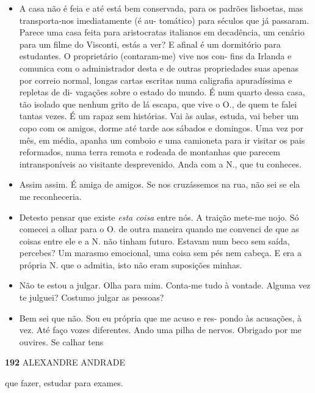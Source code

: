 \begin{itemize}
\tightlist
\item
  A casa não é feia e até está bem conservada, para os padrões
  lisboetas, mas transporta-nos imediatamente (é au- tomático) para
  séculos que já passaram. Parece uma casa feita para aristocratas
  italianos em decadência, um cenário para um filme do Visconti, estás a
  ver? E afinal é um dormitório para estudantes. O proprietário
  (contaram-me) vive nos con- fins da Irlanda e comunica com o
  administrador desta e de outras propriedades suas apenas por correio
  normal, longas cartas escritas numa caligrafia apuradíssima e repletas
  de di- vagações sobre o estado do mundo. É num quarto dessa casa, tão
  isolado que nenhum grito de lá escapa, que vive o O., de quem te falei
  tantas vezes. É um rapaz sem histórias. Vai às aulas, estuda, vai
  beber um copo com os amigos, dorme até tarde aos sábados e domingos.
  Uma vez por mês, em média, apanha um comboio e uma camioneta para ir
  visitar os pais reformados, numa terra remota e rodeada de montanhas
  que parecem intransponíveis ao visitante desprevenido. Anda com a N.,
  que tu conheces.
\item
  Assim assim. É amiga de amigos. Se nos cruzássemos na rua, não sei se
  ela me reconheceria.
\item
  Detesto pensar que existe \emph{esta coisa }entre nós. A traição
  mete-me nojo. Só comecei a olhar para o O. de outra maneira quando me
  convenci de que as coisas entre ele e a N. não tinham futuro. Estavam
  num beco sem saída, percebes? Um marasmo emocional, uma coisa sem pés
  nem cabeça. E era a própria N. que o admitia, isto não eram suposições
  minhas.
\item
  Não te estou a julgar. Olha para mim. Conta-me tudo à vontade. Alguma
  vez te julguei? Costumo julgar as pessoas?
\item
  Bem sei que não. Sou eu própria que me acuso e res- pondo às
  acusações, à vez. Até faço vozes diferentes. Ando uma pilha de nervos.
  Obrigado por me ouvires. Se calhar tens
\end{itemize}

\textbf{192 }ALEXANDRE ANDRADE

que fazer, estudar para exames.

